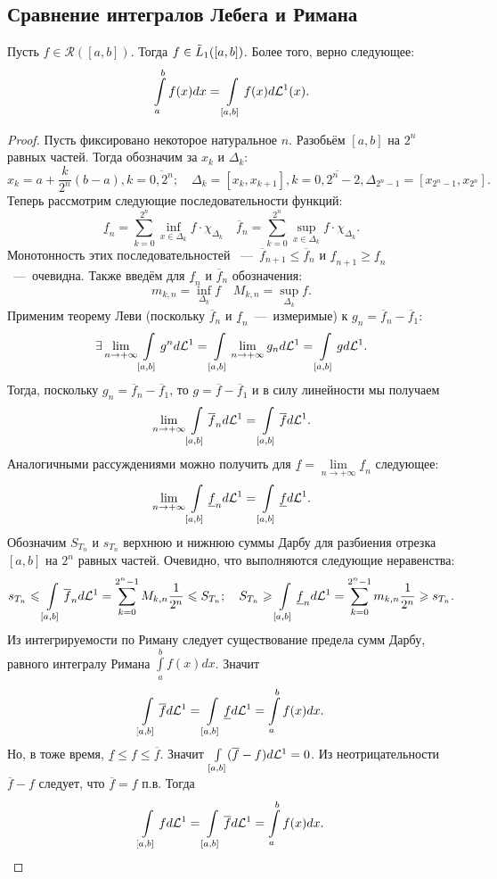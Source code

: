 \subsection{Сравнение интегралов Лебега и Римана}
\begin{theorem}
    Пусть $f \in \mathcal{R}([a, b])$. Тогда $f \in \Tilde{L}_1([a, b])$. Более того, верно следующее: \[ \int\limits_a^b f(x)dx = \int\limits_{[a, b]}f(x)d\mathcal{L}^1(x).\]
\end{theorem}
\begin{proof}
    Пусть фиксировано некоторое натуральное $n$. Разобьём $[a, b]$ на $2^n$ равных частей. Тогда обозначим за $x_k$ и $\Delta_k$: \[x_k = a + \dfrac{k}{2^n}(b - a), k = \overline{0, 2^n}; \quad \Delta_k = [x_k, x_{k + 1}], k = \overline{0, 2^n - 2}, \Delta_{2^n - 1} = [x_{2^n - 1}, x_{2^n}].\] 
    Теперь рассмотрим следующие последовательности функций: \[\underline{f}_n = \sum\limits_{k = 0}^{2^n} \inf\limits_{x \in \Delta_k} f\cdot \chi_{\Delta_k} \quad \overline{f}_n = \sum\limits_{k = 0}^{2^n} \sup\limits_{x \in \Delta_k} f\cdot \chi_{\Delta_k}.\]
    Монотонность этих последовательностей  ~---~$\overline{f}_{n + 1} \leq \overline{f}_n$ и $\underline{f}_{n + 1} \geq \underline{f}_n$~---~очевидна. Также введём для $\underline{f}_n$ и $\overline{f}_n$ обозначения: \[m_{k, n} = \inf\limits_{\Delta_k} f \quad M_{k, n} = \sup\limits_{\Delta_k} f. \]
    Применим теорему Леви (поскольку $\overline{f}_n$ и $\underline{f}_n$~---~измеримые) к $g_n = \overline{f}_n - \overline{f}_1$: \[\exists \lim\limits_{n \rightarrow +\infty} \int\limits_{[a, b]}g^nd\mathcal{L}^1 = \int\limits_{[a, b]}\lim\limits_{n \rightarrow +\infty} g_nd\mathcal{L}^1 = \int\limits_{[a, b]}gd\mathcal{L}^1.\]
    Тогда, поскольку $g_n = \overline{f}_n - \overline{f}_1$, то $g = \overline{f} - \overline{f}_1$ и в силу линейности мы получаем \[\lim\limits_{n \rightarrow +\infty} \int\limits_{[a, b]} \overline{f}_nd\mathcal{L}^1 = \int\limits_{[a, b]}\overline{f}d\mathcal{L}^1.\]
    Аналогичными рассуждениями можно получить для $\underline{f} = \lim\limits_{n \rightarrow +\infty}\underline{f}_n$ следующее: \[\lim\limits_{n \rightarrow +\infty} \int\limits_{[a, b]}\underline{f}_nd\mathcal{L}^1 = \int\limits_{[a, b]}\underline{f}d\mathcal{L}^1.\]
    Обозначим $S_{T_n}$ и $s_{T_n}$ верхнюю и нижнюю суммы Дарбу для разбиения отрезка $[a, b]$ на $2^n$ равных частей. Очевидно, что выполняются следующие неравенства: \[s_{T_n} \leqslant \int\limits_{[a, b]}\overline{f}_nd\mathcal{L}^1 = \sum\limits_{k = 0}^{2^n - 1}M_{k, n}\dfrac{1}{2^n} \leqslant S_{T_n} ;\quad S_{T_n} \geqslant \int\limits_{[a, b]} \underline{f}_n d\mathcal{L}^1 = \sum\limits_{k = 0}^{2^n - 1} m_{k, n}\dfrac{1}{2^n} \geqslant s_{T_n}.\]
    Из интегрируемости по Риману следует существование предела сумм Дарбу, равного интегралу Римана $\int\limits_a^b f(x)dx$. Значит \[\int\limits_{[a, b]}\overline{f}d\mathcal{L}^1 = \int\limits_{[a, b]}\underline{f}d\mathcal{L}^1 = \int\limits_a^bf(x)dx.\]
    Но, в тоже время, $\underline{f} \leq f \leq \overline{f}$. Значит $\int\limits_{[a, b]}(\overline{f} - f)d\mathcal{L}^1 = 0$. Из неотрицательности $\overline{f} - f$ следует, что $\overline{f} = f$ п.в. Тогда \[\int\limits_{[a, b]}fd\mathcal{L}^1 = \int\limits_{[a, b]}\overline{f}d\mathcal{L}^1 = \int\limits_a^bf(x)dx.\]
\end{proof}
